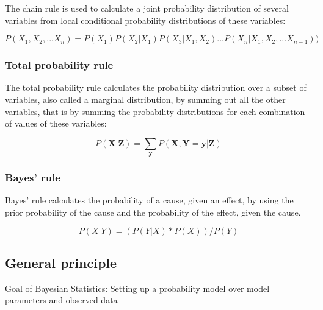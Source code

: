 \documentclass{article}
\begin{document}
The chain rule is used to calculate a \gls{joint probability distribution} of several variables from local \gls{conditional probability distribution}s of these variables:

\begin{equation}
P(X_1 ,X_2 ,...X_n ) = P(X_1 )P(X_2 | X_1 )P(X_3 | X_1 ,X_2 )...P(X_n | X_1 ,X_2 ,...X_{n-1}) )
\end{equation}

\subsubsection{Total probability rule}

The total probability rule calculates the probability distribution over a subset of variables, also called a \gls{marginal distribution}, by summing out all the other variables, that is by summing the probability distributions for each combination of values of these variables:

\begin{equation}
P(\boldsymbol X |\boldsymbol Z ) = \sum_{\boldsymbol y}   P(\boldsymbol X ,\boldsymbol Y =\boldsymbol y |\boldsymbol Z )
\end{equation} 

\subsubsection{Bayes' rule}

Bayes' rule calculates the probability of a cause, given an effect, by using the prior probability of the cause and the probability of the effect, given the cause. 

\begin{equation}
P(X|Y) = ( P(Y|X) * P(X) ) / P(Y)
\end{equation}

\subsection{General principle}
Goal of Bayesian Statistics: Setting up a probability model over model parameters and observed data
\end{document}

